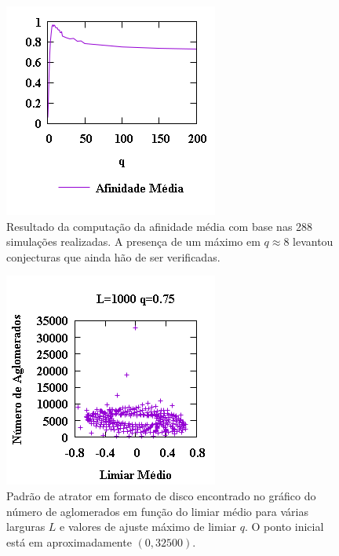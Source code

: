 \documentclass[11pt,a4paper,twocolumn,final]{article}
\begin{document}
\begin{figure}
    \centering
    \includegraphics[width=.9\linewidth]{afinidadeMedia.png}
    \caption{Resultado da computação da afinidade média com base nas 288 simulações realizadas. A presença de um máximo em $q\approx 8$ levantou conjecturas que ainda hão de ser verificadas.}
    \label{fig:afinidadeMedia}
\end{figure}

\begin{figure}
    \centering
    \includegraphics[width=.9\linewidth]{dataL1000Q75ClustersVsAvgThres.png}
    \caption{Padrão de atrator em formato de disco encontrado no gráfico do número de aglomerados em função do limiar médio para várias larguras $L$ e valores de ajuste máximo de limiar $q$. O ponto inicial está em aproximadamente $(0,32500)$.}
    \label{fig:dataL1000Q75ClustersVsAvgThres}
\end{figure}
\end{document}

